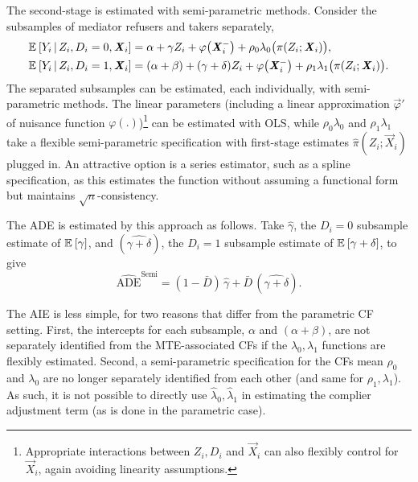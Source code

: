 The second-stage is estimated with semi-parametric methods.
Consider the subsamples of mediator refusers and takers separately,
\begin{align*}
    \mathbb{E}_{} \left[ Y_i \, \middle\vert \, Z_i, D_i = 0, \boldsymbol{\mathit{X}}_i \right] &=
        \alpha + \gamma Z_i + \varphi\big( \boldsymbol{\mathit{X}}_i^- \big)
        + \rho_0 \lambda_0 \big( \pi(Z_i ; \boldsymbol{\mathit{X}}_i) \big), \\
    \mathbb{E}_{} \left[ Y_i \, \middle\vert \, Z_i, D_i = 1, \boldsymbol{\mathit{X}}_i \right] &=
        (\alpha + \beta) + (\gamma + \delta) Z_i + \varphi\big( \boldsymbol{\mathit{X}}_i^- \big)
        + \rho_1 \lambda_1 \big( \pi(Z_i ; \boldsymbol{\mathit{X}}_i) \big).
\end{align*}
The separated subsamples can be estimated, each individually, with semi-parametric methods.
The linear parameters (including a linear approximation $\vec \varphi'$ of nuisance function $\varphi(.)$)\footnote{
    Appropriate interactions between $Z_i, D_i$ and $\vec X_i$ can also flexibly control for $\vec X_i$, again avoiding linearity assumptions.
} can be estimated with OLS, while $\rho_0 \lambda_0$ and $\rho_1 \lambda_1$ take a flexible semi-parametric specification with first-stage estimates $\hat \pi(Z_i; \vec X_i)$ plugged in.
An attractive option is a series estimator, such as a spline specification, as this estimates the function without assuming a functional form but maintains $\sqrt n$-consistency.

The ADE is estimated by this approach as follows.
Take $\hat \gamma$, the $D_i = 0$ subsample estimate of $\mathbb{E}_{} \left[ \gamma \right]$, and $(\hat{\gamma + \delta})$, the $D_i = 1$ subsample estimate of $\mathbb{E}_{} \left[ \gamma + \delta \right]$, to give
\[ \hat{\text{ADE}}^{\text{Semi}}
    = (1 - \bar D) \, \hat \gamma + \bar D \, (\hat{\gamma + \delta}). \]

The AIE is less simple, for two reasons that differ from the parametric CF setting.
First, the intercepts for each subsample, $\alpha$ and $(\alpha + \beta)$, are not separately identified from the MTE-associated CFs if the $\lambda_0, \lambda_1$ functions are flexibly estimated.
Second, a semi-parametric specification for the CFs mean $\rho_0$ and $\lambda_0$ are no longer separately identified from each other (and same for $\rho_1,\lambda_1$).
As such, it is not possible to directly use $\hat \lambda_0, \hat \lambda_1$ in estimating the complier adjustment term (as is done in the parametric case).

